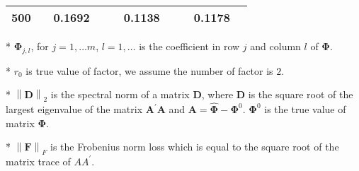 \documentclass[12pt,a4paper,hyperref]{article}
\begin{document}
\begin{table}[H]
\begin{threeparttable}
\begin{tabular} {*{10}{c}}
500& &0.1692 & &  &0.1138 & & & 0.1178& \\
\bottomrule
\end{tabular}
\begin{tablenotes}
\footnotesize
  \item[*] $\boldsymbol{\Phi}_{j,l}$, for $j=1,\ldots m$, $l=1,\ldots$ is the coefficient in row $j$ and column $l$ of $\boldsymbol{\Phi}$.
\item[*] $r_{0}$ is true value of factor, we assume the number of factor is $2$.
 \item[*] $\left\| \boldsymbol{D} \right\|_{2}$ is the spectral norm of a matrix $\boldsymbol{D}$, where $\boldsymbol{D}$ is the square root of the largest eigenvalue of the matrix $\boldsymbol{A}^{'}\boldsymbol{A}$ and $\boldsymbol{A}=\hat{\boldsymbol{\Phi}}- \boldsymbol{\Phi}^{0}$. $\boldsymbol{\Phi}^{0}$ is the true value of matrix $\boldsymbol{\Phi}$.
 \item[*] $\left\| \boldsymbol{F} \right\|_{F} $ is the Frobenius norm loss which is equal to the square root of the matrix trace of $AA^{'}$.
    \end{tablenotes}
\end{threeparttable}
\end{table}
\end{document}
